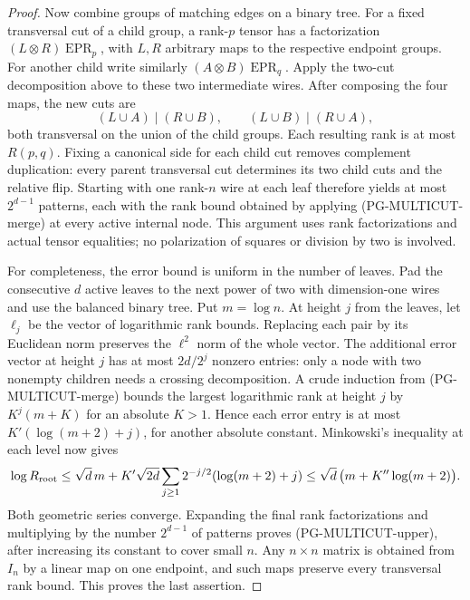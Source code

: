 \begin{proof}
Now combine groups of matching edges on a binary tree. For a fixed
transversal cut of a child group, a rank-$p$ tensor has a factorization
$(L\otimes R)\operatorname{EPR}_p$, with $L,R$ arbitrary maps to the
respective endpoint groups. For another child write similarly
$(A\otimes B)\operatorname{EPR}_q$. Apply the two-cut decomposition
above to these two intermediate wires. After composing the four maps,
the new cuts are
\[
 (L\cup A)\mid(R\cup B),\qquad
 (L\cup B)\mid(R\cup A),
\]
both transversal on the union of the child groups. Each resulting
rank is at most $R(p,q)$. Fixing a canonical side for each child cut
removes complement duplication: every parent transversal cut determines
its two child cuts and the relative flip. Starting with one rank-$n$
wire at each leaf therefore yields at most $2^{d-1}$ patterns, each
with the rank bound obtained by applying
(PG-MULTICUT-merge) at every active internal node. This argument uses
rank factorizations and actual tensor equalities; no polarization of
squares or division by two is involved.

For completeness, the error bound is uniform in the number of leaves.
Pad the consecutive $d$ active leaves to the next power of two with
dimension-one wires and use the balanced binary tree. Put $m=\log n$.
At height $j$ from the leaves, let $\boldsymbol\ell_j$ be the vector
of logarithmic rank bounds. Replacing each pair by its Euclidean norm
preserves the $\ell^2$ norm of the whole vector. The additional error
vector at height $j$ has at most $2d/2^j$ nonzero entries: only a node
with two nonempty children needs a crossing decomposition. A crude
induction from (PG-MULTICUT-merge) bounds the largest logarithmic rank
at height $j$ by $K^j(m+K)$ for an absolute $K>1$. Hence each error
entry is at most
$K'(\log(m+2)+j)$, for another absolute constant. Minkowski's inequality
at each level now gives
\[
 \log R_{\rm root}
 \leq\sqrt d\,m+
 K'\sqrt{2d}\sum_{j\geq1}2^{-j/2}
                         (\log(m+2)+j)
 \leq\sqrt d\,\bigl(m+K''\log(m+2)\bigr).
\]
Both geometric series converge. Expanding the final rank factorizations
and multiplying by the number $2^{d-1}$ of patterns proves
(PG-MULTICUT-upper), after increasing its constant to cover small $n$.
Any $n\times n$ matrix is obtained from $I_n$ by a linear map on one
endpoint, and such maps preserve every transversal rank bound. This
proves the last assertion.
\end{proof}

